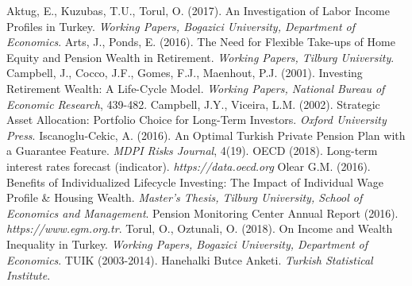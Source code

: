 \documentclass[]{elsarticle}
\begin{document}
\begin{thebibliography}{}
 Aktug, E., Kuzubas, T.U., Torul, O. (2017). An Investigation of Labor Income Profiles in Turkey. \textit{Working Papers, Bogazici University, Department of Economics}.
 Arts, J., Ponds, E. (2016). The Need for Flexible Take-ups of Home Equity and Pension Wealth in Retirement. \textit{Working Papers, Tilburg University}.
 Campbell, J., Cocco, J.F., Gomes, F.J., Maenhout, P.J. (2001). Investing Retirement Wealth: A Life-Cycle Model. \textit{Working Papers, National Bureau of Economic Research}, 439-482.
 Campbell, J.Y., Viceira, L.M. (2002). Strategic Asset Allocation: Portfolio Choice for Long-Term Investors. \textit{Oxford University Press}.
 Iscanoglu-Cekic, A. (2016). An Optimal Turkish Private Pension Plan with a Guarantee Feature. \textit{MDPI Risks Journal}, 4(19).
 OECD (2018). Long-term interest rates forecast (indicator). \textit{https://data.oecd.org}
 Olear G.M. (2016). Benefits of Individualized Lifecycle Investing: The Impact of Individual Wage Profile \& Housing Wealth. \textit{Master's Thesis, Tilburg University, School of Economics and Management}.
 Pension Monitoring Center Annual Report (2016). \textit{https://www.egm.org.tr}.
 Torul, O., Oztunali, O. (2018). On Income and Wealth Inequality in Turkey. \textit{Working Papers, Bogazici University, Department of Economics}.
 TUIK (2003-2014). Hanehalki Butce Anketi. \textit{Turkish Statistical Institute}.
\end{thebibliography}

\end{document}
